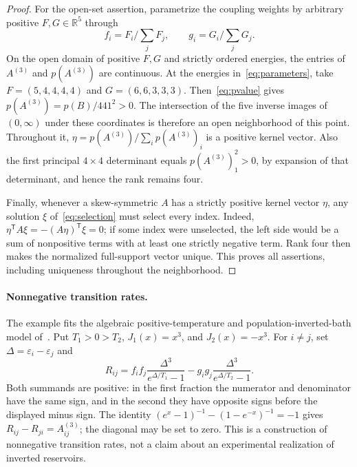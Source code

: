 \documentclass[11pt]{article}
\newcommand{\R}{\mathbb R}
\begin{document}
\begin{proof}
For the open-set assertion, parametrize the coupling weights by
arbitrary positive $F,G\in\R^5$ through
\begin{equation}\label{eq:normalize}
 f_i=F_i/\textstyle\sum_j F_j,\qquad
 g_i=G_i/\textstyle\sum_j G_j.
\end{equation}
On the open domain of positive $F,G$ and strictly ordered
energies, the entries of $A^{(3)}$ and $p(A^{(3)})$ are continuous.
At the energies in~\eqref{eq:parameters}, take $F=(5,4,4,4,4)$
and $G=(6,6,3,3,3)$.
Then~\eqref{eq:pvalue} gives $p(A^{(3)})=p(B)/441^2>0$.
The intersection of the five inverse images of $(0,\infty)$
under these coordinates is therefore an open neighborhood of
this point. Throughout it,
$\eta=p(A^{(3)})/\sum_i p(A^{(3)})_i$ is a positive kernel vector.
Also the first principal $4\times4$ determinant equals
$p(A^{(3)})_1^2>0$, by expansion of that determinant, and hence
the rank remains four.

Finally, whenever a skew-symmetric $A$ has a strictly positive
kernel vector $\eta$, any solution $\xi$ of~\eqref{eq:selection}
must select every index. Indeed,
$\eta^{\mathsf T}A\xi=-(A\eta)^{\mathsf T}\xi=0$;
if some index were unselected, the left side would be a sum
of nonpositive terms with at least one strictly negative term.
Rank four then makes the normalized full-support vector unique.
This proves all assertions, including uniqueness throughout
the neighborhood.
\end{proof}

\paragraph{Nonnegative transition rates.}
The example fits the algebraic positive-temperature and
population-inverted-bath model of~\cite[Sec.\ V]{ske}.
Put $T_1>0>T_2$, $J_1(x)=x^3$, and $J_2(x)=-x^3$.
For $i\ne j$, set $\Delta=\varepsilon_i-\varepsilon_j$ and
\[
 R_{ij}= f_if_j\frac{\Delta^3}{e^{\Delta/T_1}-1}
       -g_ig_j\frac{\Delta^3}{e^{\Delta/T_2}-1}.
\]
Both summands are positive: in the first fraction the numerator
and denominator have the same sign, and in the second they
have opposite signs before the displayed minus sign.
The identity $(e^x-1)^{-1}-(1-e^{-x})^{-1}=-1$ gives
$R_{ij}-R_{ji}=A^{(3)}_{ij}$; the diagonal may be set to zero.
This is a construction of nonnegative transition rates, not a
claim about an experimental realization of inverted reservoirs.
\end{document}
